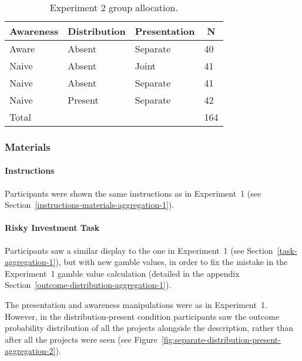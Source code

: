 \documentclass[a4paper, nobind]{templates/ociamthesis}
\theoremstyle{definition}
\theoremstyle{definition}
\theoremstyle{definition}
\theoremstyle{definition}
\theoremstyle{remark}
\begin{document}
\begin{table}[tbp]

\begin{center}
\begin{threeparttable}

\caption{\label{tab:condition-allocation-aggregation-2}Experiment 2 group allocation.}

\begin{tabular}{llll}
\toprule
Awareness & \multicolumn{1}{c}{Distribution} & \multicolumn{1}{c}{Presentation} & \multicolumn{1}{c}{N}\\
\midrule
Aware & Absent & Separate & 40\\
Naive & Absent & Joint & 41\\
Naive & Absent & Separate & 41\\
Naive & Present & Separate & 42\\
Total &  &  & 164\\
\bottomrule
\end{tabular}

\end{threeparttable}
\end{center}

\end{table}

\subsubsection{Materials}

\paragraph{Instructions}

Participants were shown the same instructions as in Experiment~1 (see
Section~\ref{instructions-materials-aggregation-1}).

\hypertarget{task-aggregation-2}{%
\paragraph{Risky Investment Task}\label{task-aggregation-2}}

Participants saw a similar display to the one in Experiment~1 (see
Section~\ref{task-aggregation-1}), but with new gamble values, in order to fix
the mistake in the Experiment~1 gamble value calculation (detailed in the
appendix Section~\ref{outcome-distribution-aggregation-1}).

The presentation and awareness manipulations were as in Experiment~1. However,
in the distribution-present condition participants saw the outcome probability
distribution of all the projects alongside the description, rather than after
all the projects were seen (see
Figure~\ref{fig:separate-distribution-present-aggregation-2}).
\end{document}
